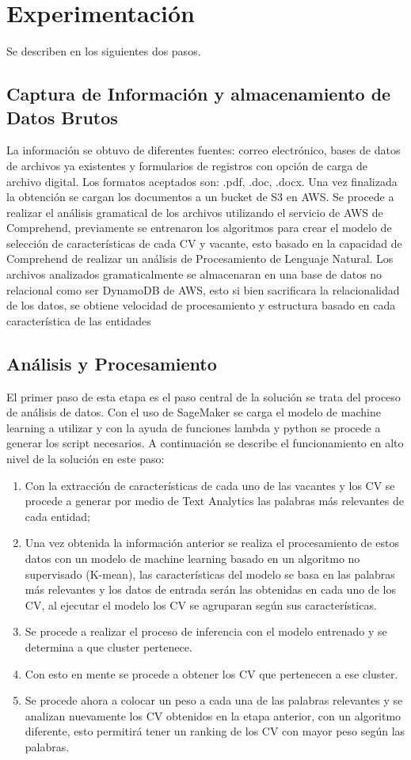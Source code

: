 \documentclass[a4paper]{jpconf}
\begin{document}
\section{Experimentación}
Se describen en los siguientes dos pasos.

\subsection{Captura de Información y almacenamiento de Datos Brutos}
La información se obtuvo de diferentes fuentes: correo electrónico, bases de datos de archivos ya existentes y formularios de registros con opción de carga de archivo digital. Los formatos aceptados son: .pdf, .doc, .docx.
Una vez finalizada la obtención se cargan los documentos a un bucket de S3 en AWS.  
Se procede a realizar el análisis gramatical de los archivos utilizando el servicio de AWS de Comprehend, previamente se entrenaron los algoritmos para crear el modelo de selección de características de cada CV y vacante, esto basado en la capacidad de Comprehend de realizar un análisis de Procesamiento de Lenguaje Natural.
Los archivos analizados gramaticalmente se almacenaran en una base de datos no relacional como ser DynamoDB de AWS, esto si bien sacrificara la relacionalidad de los datos, se obtiene velocidad de procesamiento y estructura basado en cada característica de las entidades


\subsection{Análisis y Procesamiento}
El primer paso de esta etapa es el paso central de la solución se trata del proceso de análisis de datos. Con el uso de SageMaker se carga el modelo de machine learning a utilizar y con la ayuda de funciones lambda y python se procede a generar los script necesarios. A continuación se describe el funcionamiento en alto nivel de la solución en este paso:
\begin{enumerate}
\item Con la extracción de características de cada uno de las vacantes y los CV se procede a generar por medio de Text Analytics las palabras más relevantes de cada entidad;
\item 	Una vez obtenida la información anterior se realiza el procesamiento de estos datos con un modelo de machine learning basado en un algoritmo no supervisado (K-mean), las características del modelo se basa en las palabras más relevantes y los datos de entrada serán las obtenidas en cada uno de los CV, al ejecutar el modelo los CV se agruparan según sus características.
\item Se procede a realizar el proceso de inferencia con el modelo entrenado y se determina a que cluster pertenece. 
\item Con esto en mente se procede a obtener los CV que pertenecen a ese cluster.
\item Se procede ahora a colocar un peso a cada una de las palabras relevantes y se analizan nuevamente los CV obtenidos en la etapa anterior, con un algoritmo diferente, esto permitirá tener un ranking de los CV con mayor peso según las palabras.
\end{enumerate}
\end{document}
